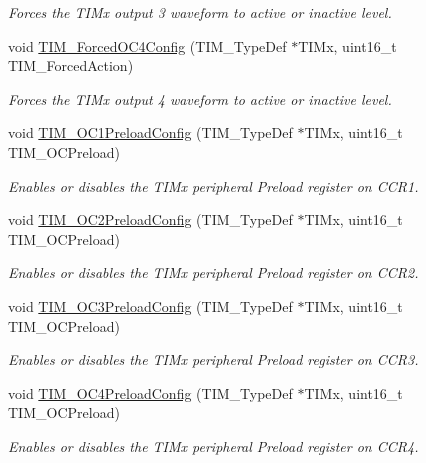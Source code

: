 \begin{DoxyCompactItemize}
\begin{DoxyCompactList}\small\item\em Forces the T\-I\-Mx output 3 waveform to active or inactive level. \end{DoxyCompactList}\item 
void \hyperlink{group___t_i_m_gaf0a0bbe74251e56d4b835d20b0a3aa63}{T\-I\-M\-\_\-\-Forced\-O\-C4\-Config} (T\-I\-M\-\_\-\-Type\-Def $\ast$T\-I\-Mx, uint16\-\_\-t T\-I\-M\-\_\-\-Forced\-Action)
\begin{DoxyCompactList}\small\item\em Forces the T\-I\-Mx output 4 waveform to active or inactive level. \end{DoxyCompactList}\item 
void \hyperlink{group___t_i_m_ga60e6c29ad8f919bef616cf8e3306dd64}{T\-I\-M\-\_\-\-O\-C1\-Preload\-Config} (T\-I\-M\-\_\-\-Type\-Def $\ast$T\-I\-Mx, uint16\-\_\-t T\-I\-M\-\_\-\-O\-C\-Preload)
\begin{DoxyCompactList}\small\item\em Enables or disables the T\-I\-Mx peripheral Preload register on C\-C\-R1. \end{DoxyCompactList}\item 
void \hyperlink{group___t_i_m_ga75b4614c6dd2cd52f2c5becdb6590c10}{T\-I\-M\-\_\-\-O\-C2\-Preload\-Config} (T\-I\-M\-\_\-\-Type\-Def $\ast$T\-I\-Mx, uint16\-\_\-t T\-I\-M\-\_\-\-O\-C\-Preload)
\begin{DoxyCompactList}\small\item\em Enables or disables the T\-I\-Mx peripheral Preload register on C\-C\-R2. \end{DoxyCompactList}\item 
void \hyperlink{group___t_i_m_ga8b2391685a519e60e596b7d596f86f09}{T\-I\-M\-\_\-\-O\-C3\-Preload\-Config} (T\-I\-M\-\_\-\-Type\-Def $\ast$T\-I\-Mx, uint16\-\_\-t T\-I\-M\-\_\-\-O\-C\-Preload)
\begin{DoxyCompactList}\small\item\em Enables or disables the T\-I\-Mx peripheral Preload register on C\-C\-R3. \end{DoxyCompactList}\item 
void \hyperlink{group___t_i_m_ga8bf4dfb35ff0c7b494dd96579f50b1ec}{T\-I\-M\-\_\-\-O\-C4\-Preload\-Config} (T\-I\-M\-\_\-\-Type\-Def $\ast$T\-I\-Mx, uint16\-\_\-t T\-I\-M\-\_\-\-O\-C\-Preload)
\begin{DoxyCompactList}\small\item\em Enables or disables the T\-I\-Mx peripheral Preload register on C\-C\-R4. \end{DoxyCompactList}\item 

\end{DoxyCompactItemize}
